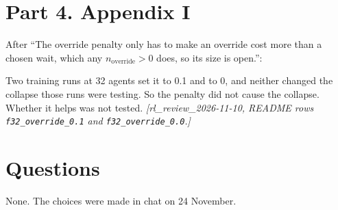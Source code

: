\documentclass[11pt,a4paper]{article}
\newcommand{\new}[1]{\textcolor{newc}{#1}}
\newcommand{\note}[1]{{\small\itshape [#1]}}
\begin{document}
\section*{Part 4. Appendix I}
After ``The override penalty only has to make an override cost more than a
chosen wait, which any $n_{\mathrm{override}} > 0$ does, so its size is
open.'':

\new{Two training runs at 32 agents set it to 0.1 and to 0, and neither
changed the collapse those runs were testing. So the penalty did not cause
the collapse. Whether it helps was not tested.} \note{rl\_review\_2026-11-10,
README rows \texttt{f32\_override\_0.1} and \texttt{f32\_override\_0.0}.}

\section*{Questions}
None. The choices were made in chat on 24 November.
\end{document}
